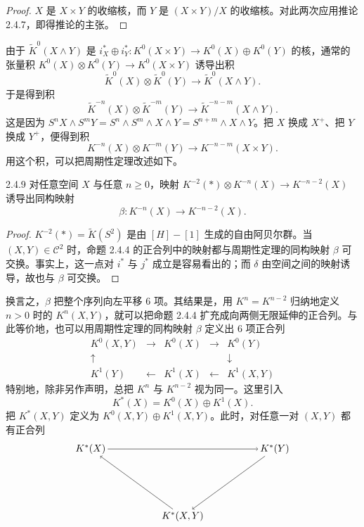 \begin{proof}
  $X$ 是 $X\times Y$ 的收缩核，而 $Y$ 是 $(X\times Y)/X$ 的收缩核。对此两次应用推论 2.4.7，即得推论的主张。
\end{proof}

由于 $\tilde K^0(X\wedge Y)$ 是 $i_X^*\oplus i_Y^*\colon K^0(X\times Y)\to K^0(X)\oplus K^0(Y)$ 的核，通常的张量积 $K^0(X)\otimes K^0(Y)\to K^0(X\times Y)$ 诱导出积
\[
\tilde K^0(X)\otimes\tilde K^0(Y)\longrightarrow\tilde K^0(X\wedge Y).
\]
于是得到积
\[
\tilde K^{-n}(X)\otimes\tilde K^{-m}(Y)\longrightarrow\tilde K^{-n-m}(X\wedge Y).
\]
这是因为 $S^nX\wedge S^mY=S^n\wedge S^m\wedge X\wedge Y=S^{n+m}\wedge X\wedge Y$。把 $X$ 换成 $X^+$、把 $Y$ 换成 $Y^+$，便得到积
\[
K^{-n}(X)\otimes K^{-m}(Y)\longrightarrow K^{-n-m}(X\times Y).
\]
用这个积，可以把周期性定理改述如下。

\begin{theorem*}{2.4.9}
  对任意空间 $X$ 与任意 $n\ge0$，映射 $K^{-2}(*)\otimes K^{-n}(X)\to K^{-n-2}(X)$ 诱导出同构映射
  \[
  \beta\colon K^{-n}(X)\longrightarrow K^{-n-2}(X).
  \]
\end{theorem*}

\begin{proof}
  $K^{-2}(*)=\tilde K(S^2)$ 是由 $[H]-[1]$ 生成的自由阿贝尔群。当 $(X,Y)\in\mathcal{C}^2$ 时，命题 2.4.4 的正合列中的映射都与周期性定理的同构映射 $\beta$ 可交换。事实上，这一点对 $i^*$ 与 $j^*$ 成立是容易看出的；而 $\delta$ 由空间之间的映射诱导，故也与 $\beta$ 可交换。
\end{proof}

换言之，$\beta$ 把整个序列向左平移 6 项。其结果是，用 $K^n=K^{n-2}$ 归纳地定义 $n>0$ 时的 $K^n(X,Y)$，就可以把命题 2.4.4 扩充成向两侧无限延伸的正合列。与此等价地，也可以用周期性定理的同构映射 $\beta$ 定义出 6 项正合列
\[
\begin{array}{ccccc}
K^0(X,Y) & \longrightarrow & K^0(X) & \longrightarrow & K^0(Y)\\[6pt]
\uparrow & & & & \downarrow\\[6pt]
K^1(Y) & \longleftarrow & K^1(X) & \longleftarrow & K^1(X,Y)
\end{array}
\]
特别地，除非另作声明，总把 $K^n$ 与 $K^{n-2}$ 视为同一。这里引入
\[
K^*(X)=K^0(X)\oplus K^1(X).
\]
把 $K^*(X,Y)$ 定义为 $K^0(X,Y)\oplus K^1(X,Y)$。此时，对任意一对 $(X,Y)$
都有正合列
\[
\begin{tikzpicture}[scale=1,every node/.style={inner sep=2pt}]
\node (A) at (0,1.5) {$K^*(X)$};
\node (B) at (6.6,1.5) {$K^*(Y)$};
\node (C) at (3.3,-0.9) {$K^*(X,Y)$};
\draw[->] (A) -- (B);
\draw[->] (C) -- (A);
\draw[->] (B) -- (C);
\end{tikzpicture}
\]

